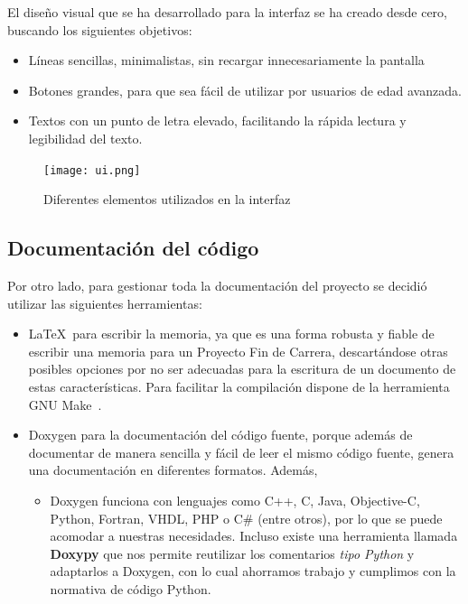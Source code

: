 El diseño visual que se ha desarrollado para la interfaz se ha creado desde cero, buscando los siguientes objetivos:
\begin{itemize}
    \item Líneas sencillas, minimalistas, sin recargar innecesariamente la pantalla
    \item Botones grandes, para que sea fácil de utilizar por usuarios de edad avanzada.
    \item Textos con un punto de letra elevado, facilitando la rápida lectura y legibilidad del texto.
\end{itemize}

\begin{figure}[h]
  \label{interfaz}
  \begin{center}
    \texttt{[image: ui.png]}
  \end{center}
  \caption{Diferentes elementos utilizados en la interfaz}
\end{figure}

\subsection{Documentación del código}

Por otro lado, para gestionar toda la documentación del proyecto se decidió utilizar las siguientes herramientas:
\begin{itemize}
    \item \LaTeX\ para escribir la memoria, ya que es una forma robusta y fiable de escribir una memoria para
            un Proyecto Fin de Carrera, descartándose otras posibles opciones por no ser adecuadas para la escritura
            de un documento de estas características. Para facilitar la compilación dispone de la herramienta
            GNU Make~\cite{pdf:make}.
    \item Doxygen para la documentación del código fuente, porque además de documentar de manera sencilla y fácil
            de leer el mismo código fuente, genera una documentación en diferentes formatos. Además,
        \begin{itemize}
            \item Doxygen funciona con lenguajes como C++, C, Java, Objective-C, Python, Fortran, VHDL, PHP o C\#
                    (entre otros), por lo que se puede acomodar a nuestras necesidades. Incluso existe una
                    herramienta llamada \textbf{Doxypy} que nos permite reutilizar los comentarios \emph{tipo Python}
                    y adaptarlos a Doxygen, con lo cual ahorramos trabajo y cumplimos con la normativa
                    de código Python.
        \end{itemize}
\end{itemize}

